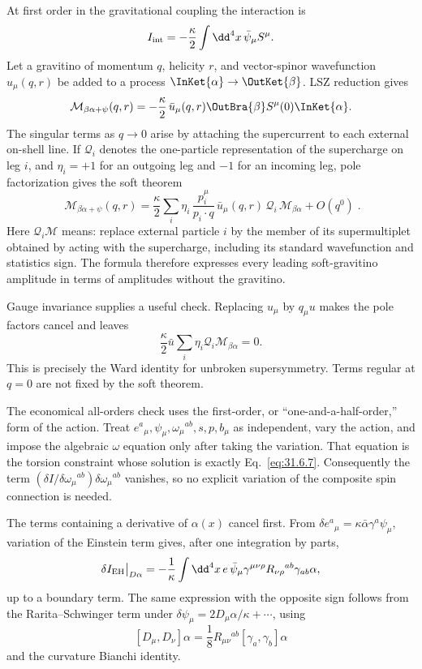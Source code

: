 \begin{enumerate}
  At first order in the gravitational coupling the interaction is
  \[
    I_{\rm int}=-\frac{\kappa}{2}\int \dd^4x\,
      \bar\psi_\mu S^\mu .
  \]
  Let a gravitino of momentum \(q\), helicity \(r\), and vector-spinor
  wavefunction \(u_\mu(q,r)\) be added to a process
  \(\InKet{\alpha}\to\OutKet{\beta}\).  LSZ reduction gives
  \[
    \mathcal M_{\beta\alpha+\psi}(q,r)
      =-\frac{\kappa}{2}\,
       \bar u_\mu(q,r)
       \OutBra{\beta}S^\mu(0)\InKet{\alpha}.
  \]
  The singular terms as \(q\to0\) arise by attaching the supercurrent to
  each external on-shell line.  If \(\mathcal Q_i\) denotes the
  one-particle representation of the supercharge on leg \(i\), and
  \(\eta_i=+1\) for an outgoing leg and \(-1\) for an incoming leg, pole
  factorization gives the soft theorem
  \[
    \boxed{\;
    \mathcal M_{\beta\alpha+\psi}(q,r)
      =\frac{\kappa}{2}
       \sum_i\eta_i\,\frac{p_i^\mu}{p_i\mathbin{\cdot}q}\,
       \bar u_\mu(q,r)\,\mathcal Q_i\,
       \mathcal M_{\beta\alpha}
       +O(q^0)\; .}
  \]
  Here \(\mathcal Q_i\mathcal M\) means: replace external particle \(i\)
  by the member of its supermultiplet obtained by acting with the
  supercharge, including its standard wavefunction and statistics sign.
  The formula therefore expresses every leading soft-gravitino amplitude
  in terms of amplitudes without the gravitino.

  Gauge invariance supplies a useful check.  Replacing
  \(u_\mu\) by \(q_\mu u\) makes the pole factors cancel and leaves
  \[
    \frac{\kappa}{2}\bar u\sum_i\eta_i\mathcal Q_i
      \mathcal M_{\beta\alpha}=0.
  \]
  This is precisely the Ward identity for unbroken supersymmetry.  Terms
  regular at \(q=0\) are not fixed by the soft theorem.

  The economical all-orders check uses the first-order, or
  ``one-and-a-half-order,'' form of the action.  Treat
  \(e^a{}_\mu,\psi_\mu,\omega_\mu{}^{ab},s,p,b_\mu\) as independent,
  vary the action, and impose the algebraic \(\omega\) equation only
  after taking the variation.  That equation is the torsion constraint
  whose solution is exactly Eq.~\eqref{eq:31.6.7}.  Consequently the
  term
  \((\delta I/\delta\omega_\mu{}^{ab})\delta\omega_\mu{}^{ab}\)
  vanishes, so no explicit variation of the composite spin connection
  is needed.

  The terms containing a derivative of \(\alpha(x)\) cancel first.
  From \(\delta e^a{}_\mu=\kappa\bar\alpha\gamma^a\psi_\mu\), variation
  of the Einstein term gives, after one integration by parts,
  \[
    \delta I_{\rm EH}\big|_{D\alpha}
      =-\frac1\kappa\int \dd^4x\,e\,
        \bar\psi_\mu\gamma^{\mu\nu\rho}
        R_{\nu\rho}{}^{ab}\gamma_{ab}\alpha ,
  \]
  up to a boundary term.  The same expression with the opposite sign
  follows from the Rarita--Schwinger term under
  \(\delta\psi_\mu=2D_\mu\alpha/\kappa+\cdots\), using
  \[
    [D_\mu,D_\nu]\alpha
      =\frac18R_{\mu\nu}{}^{ab}[\gamma_a,\gamma_b]\alpha
  \]
  and the curvature Bianchi identity.


\end{enumerate}
